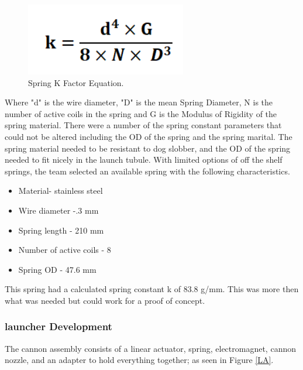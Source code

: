 \documentclass[11pt]{article}
\begin{document}
\begin{figure}[H]
    \centering
        \includegraphics[scale=.8, angle =0]{figures/K.PNG}
    \caption{Spring K Factor Equation.}
    \label{k}
\end{figure}
Where "d" is the wire diameter, "D" is the mean Spring Diameter, N is the number of active coils in the spring and G is the Modulus of Rigidity of the spring material. There were a number of the spring constant parameters that could not be altered including the OD of the spring and the spring marital. The spring material needed to be resistant to dog slobber, and the OD of the spring needed to fit nicely in the launch tubule. With limited options of off the shelf springs, the team selected an available spring with the following characteristics.
\begin{itemize}
    \item Material- stainless steel
    \item Wire diameter -.3 mm 
    \item Spring length - 210 mm
    \item Number of active coils - 8
    \item Spring OD - 47.6 mm
\end{itemize}
This spring had a calculated spring constant k of 83.8 g/mm. This was more then what was needed but could work for a proof of concept. 

\subsubsection{launcher Development}
The cannon assembly consists of a linear actuator, spring, electromagnet, cannon nozzle, and an adapter to hold everything together; as seen in Figure \ref{LA}.
\end{document}
